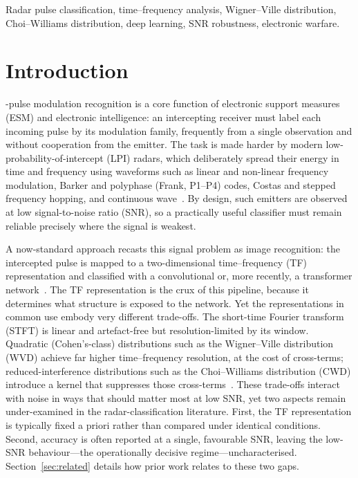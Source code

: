 \documentclass[journal]{IEEEtran}
\begin{document}
\begin{IEEEkeywords}
Radar pulse classification, time--frequency analysis, Wigner--Ville distribution,
Choi--Williams distribution, deep learning, SNR robustness, electronic warfare.
\end{IEEEkeywords}

\section{Introduction}
-pulse modulation recognition is a core function of
electronic support measures (ESM) and electronic intelligence: an intercepting
receiver must label each incoming pulse by its modulation family, frequently from
a single observation and without cooperation from the emitter. The task is made
harder by modern low-probability-of-intercept (LPI) radars, which deliberately
spread their energy in time and frequency using waveforms such as linear and
non-linear frequency modulation, Barker and polyphase (Frank, P1--P4) codes,
Costas and stepped frequency hopping, and continuous wave~\cite{pace2009lpi}. By
design, such emitters are observed at low signal-to-noise ratio (SNR), so a
practically useful classifier must remain reliable precisely where the signal is
weakest.

A now-standard approach recasts this signal problem as image recognition: the
intercepted pulse is mapped to a two-dimensional time--frequency (TF)
representation and classified with a convolutional or, more recently, a
transformer network~\cite{zhang2017cnn,kong2018cnn,qu2018intrapulse}. The TF
representation is the crux of this pipeline, because it determines what structure
is exposed to the network. Yet the representations in common use embody very
different trade-offs. The short-time Fourier transform (STFT) is linear and
artefact-free but resolution-limited by its window. Quadratic (Cohen's-class)
distributions such as the Wigner--Ville distribution (WVD) achieve far higher
time--frequency resolution, at the cost of cross-terms; reduced-interference
distributions such as the Choi--Williams distribution (CWD) introduce a kernel
that suppresses those cross-terms~\cite{choi1989,cohen1989,jeong1992kernel}.
These trade-offs interact with noise in ways that should matter most at low SNR,
yet two aspects remain under-examined in the radar-classification literature.
First, the TF representation is typically fixed a priori rather than compared
under identical conditions. Second, accuracy is often reported at a single,
favourable SNR, leaving the low-SNR behaviour---the operationally decisive
regime---uncharacterised. Section~\ref{sec:related} details how prior work
relates to these two gaps.
\end{document}
